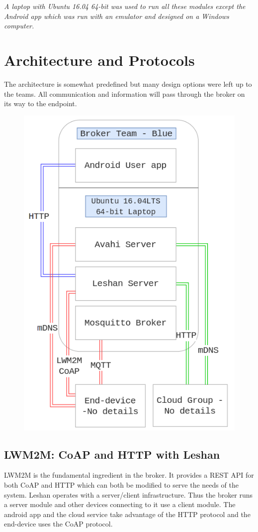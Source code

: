\documentclass[conference]{IEEEtran}
\begin{document}
\textit{A laptop with Ubuntu 16.04 64-bit was used to run all these modules except the Android app which was run with an emulator and designed on a Windows computer.}

\section{Architecture and Protocols}

The architecture is somewhat predefined but many design options were left up to the teams. All communication and information will pass through the broker on its way to the endpoint. 

\begin{figure}[h]
	\begin{center}
		\includegraphics[width=0.8\linewidth]{img/overview}
		\caption{}
		\label{fig:fig2}
	\end{center}
\end{figure}
\subsection{LWM2M: CoAP and HTTP with Leshan}
LWM2M is the fundamental ingredient in the broker. It provides a REST API for both CoAP and HTTP which can both be modified to serve the needs of the system. Leshan operates with a server/client infrastructure. Thus the broker runs a server module and other devices connecting to it use a client module. The android app and the cloud service take advantage of the HTTP protocol and the end-device uses the CoAP protocol.
\end{document}
